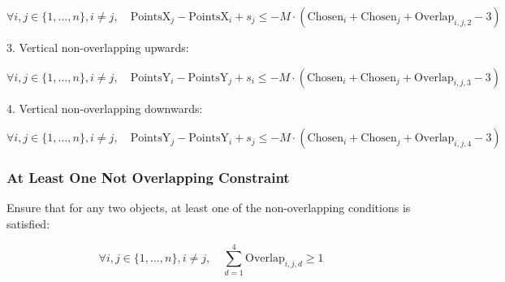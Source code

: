 \documentclass{article}
\begin{document}
\[
\forall i, j \in \{1, \ldots, n\}, i \neq j, \quad \text{PointsX}_j - \text{PointsX}_i + s_j \leq -M \cdot (\text{Chosen}_i + \text{Chosen}_j + \text{Overlap}_{i,j,2} - 3)
\]

3. Vertical non-overlapping upwards:

\[
\forall i, j \in \{1, \ldots, n\}, i \neq j, \quad \text{PointsY}_i - \text{PointsY}_j + s_i \leq -M \cdot (\text{Chosen}_i + \text{Chosen}_j + \text{Overlap}_{i,j,3} - 3)
\]

4. Vertical non-overlapping downwards:

\[
\forall i, j \in \{1, \ldots, n\}, i \neq j, \quad \text{PointsY}_j - \text{PointsY}_i + s_j \leq -M \cdot (\text{Chosen}_i + \text{Chosen}_j + \text{Overlap}_{i,j,4} - 3)
\]

\subsubsection{At Least One Not Overlapping Constraint}

Ensure that for any two objects, at least one of the non-overlapping conditions is satisfied:

\[
\forall i, j \in \{1, \ldots, n\}, i \neq j, \quad \sum_{d=1}^4 \text{Overlap}_{i,j,d} \geq 1
\]
\end{document}
